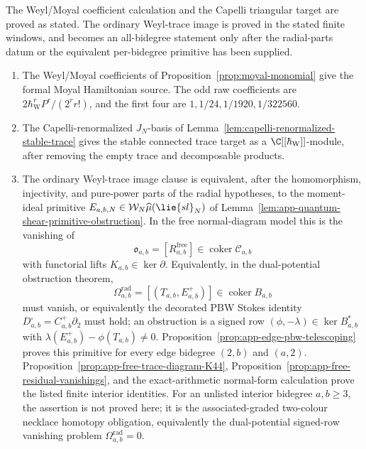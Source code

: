 \documentclass[11pt]{memoir}
\begin{document}
\begin{thm}
  The Weyl/Moyal coefficient calculation and the Capelli triangular
  target are proved as stated.  The ordinary Weyl-trace image is proved
  in the stated finite windows, and becomes an all-bidegree statement
  only after the radial-parts datum or the equivalent per-bidegree
  primitive has been supplied.
  \begin{enumerate}
    \item The Weyl/Moyal coefficients of
      Proposition~\ref{prop:moyal-monomial} give the formal Moyal
      Hamiltonian source.  The odd raw coefficients are
      \(2\hbar_{\mathrm{W}}^rP^r/(2^r r!)\), and the first four are
      \(1,1/24,1/1920,1/322560\).
    \item The Capelli-renormalized \(J_N\)-basis of
      Lemma~\ref{lem:capelli-renormalized-stable-trace} gives the stable
      connected trace target as a \(\C[[\hbar_{\mathrm{W}}]]\)-module, after removing
      the empty trace and decomposable products.
    \item The ordinary Weyl-trace image clause is equivalent, after the
      homomorphism, injectivity, and pure-power parts of the radial
      hypotheses, to the moment-ideal primitive
      \(E_{a,b,N}\in\mathcal W_N\widehat\mu(\lie{sl}_N)\) of
      Lemma~\ref{lem:app-quantum-shear-primitive-obstruction}.  In the
      free normal-diagram model this is the vanishing of
      \[
        \mathfrak o_{a,b}
        =[R^{\mathrm{free}}_{a,b}]
        \in\operatorname{coker}\mathcal C_{a,b}
      \]
      with functorial lifts \(K_{a,b}\in\ker\partial\).
      Equivalently, in the dual-potential obstruction theorem,
      \[
        \Omega^{\mathrm{rad}}_{a,b}
        =
        [(T_{a,b},E^+_{a,b})]\in\operatorname{coker}B_{a,b}
      \]
      must vanish, or equivalently the decorated PBW Stokes identity
      \(D^\square_{a,b}=C^+_{a,b}\partial_2\) must hold; an obstruction is a
      signed row \((\phi,-\lambda)\in\ker B_{a,b}^*\) with
      \(\lambda(E^+_{a,b})-\phi(T_{a,b})\ne0\).
      Proposition~\ref{prop:app-edge-pbw-telescoping} proves this
      primitive for every edge bidegree \((2,b)\) and \((a,2)\).
      Proposition~\ref{prop:app-free-trace-diagram-K44},
      Proposition~\ref{prop:app-free-residual-vanishings}, and the
      exact-arithmetic normal-form calculation prove the listed finite
      interior identities.  For an unlisted interior bidegree
      \(a,b\geq3\), the assertion is not proved here; it is the
      associated-graded two-colour necklace homotopy obligation,
      equivalently the dual-potential signed-row vanishing problem
      \(\Omega^{\mathrm{rad}}_{a,b}=0\).
  \end{enumerate}


\end{thm}
\end{document}

